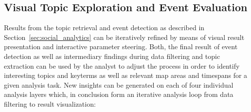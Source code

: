 \subsection{Visual Topic Exploration and Event Evaluation}
Results from the topic retrieval and event detection as described in Section~\ref{sec:social_analytics} can be iteratively refined by means of visual result presentation and interactive parameter steering. Both, the final result of event detection as well as intermediary findings during data filtering and topic extraction can be used by the analyst to adjust the process in order to identify interesting topics and keyterms as well as relevant map areas and timespans for a given analysis task. New insights can be generated on each of four individual analysis layers which, in conclusion form an iterative analysis loop from data filtering to result visualization:
